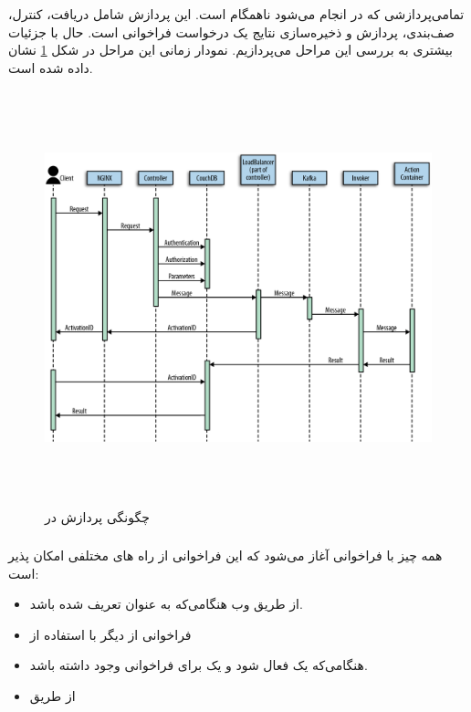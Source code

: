 \newpage

تمامی‌پردازشی که در  انجام می‌شود ناهمگام است. این پردازش شامل دریافت، کنترل، صف‌بندی، پردازش و ذخیره‌سازی نتایج یک درخواست فراخوانی  است. حال با جزئیات بیشتری به بررسی این مراحل می‌پردازیم. نمودار زمانی این مراحل در شکل \ref{action_invokation_timeline} نشان داده شده است.

\begin{figure}[!h]
	\centering
	\includegraphics[height=12cm]{images/action_invokation_timeline}
	\caption{چگونگی پردازش  در }
	\label{action_invokation_timeline}
\end{figure}

\subsubsection*{}

همه چیز با فراخوانی  آغاز می‌شود که این فراخوانی از راه های مختلفی امکان پذیر است:

\begin{itemize}

	\item از طریق وب هنگامی‌که  به عنوان  تعریف شده باشد.
	
	\item فراخوانی از  دیگر با استفاده از 
	
	\item هنگامی‌که یک  فعال شود و یک  برای فراخوانی  وجود داشته باشد.
	
	\item از طریق 
	
\end{itemize}

